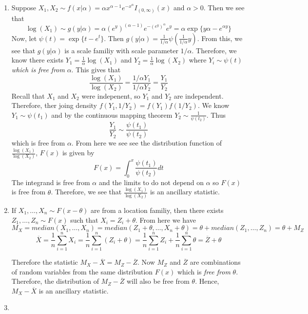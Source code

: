 \documentclass[12pt]{article}  %
\begin{document}
\begin{enumerate}
\begin{enumerate}
\end{enumerate}

\item Suppose $X_1, X_2\sim f(x|\alpha) = \alpha x^{\alpha - 1}e^{-x^{\alpha}}I_{(0, \infty)}(x)$ and $\alpha >0$. Then we see that $$\log(X_1) \sim g(y|\alpha) = \alpha(e^{y})^{(\alpha - 1)}e^{-(e^{y})^{\alpha}}e^{y} = \alpha \exp\big\{y\alpha - e^{\alpha y}\big\}$$ Now, let $\psi(t) = \exp\{t - e^t\}$. Then $g(y|\alpha) = \frac{1}{1/\alpha}\psi(\frac{1}{1/\alpha}y)$. From this, we see that $g(y|\alpha)$ is a scale familiy with scale parameter $1/\alpha$. Therefore, we know there exists $Y_1 = \frac{1}{\alpha}\log(X_1)$ and  $Y_2 = \frac{1}{\alpha}\log(X_2)$ where $Y_i\sim\psi(t)$ \textit{which is free from} $\alpha$. This gives that $$\frac{\log(X_1)}{\log(X_2)} = \frac{1/\alpha Y_1}{1/\alpha Y_2} = \frac{Y_1}{Y_2}$$ Recall that $X_1$ and $X_2$ were indepenent, so $Y_1$ and $Y_2$ are independent. Therefore, ther joing density $f(Y_1, 1/Y_2) = f(Y_1)f(1/Y_2)$. We know $Y_1\sim \psi(t_1)$ and by the continuous mapping theorem $Y_2 \sim \frac{1}{\psi(t_2)}$. Thus $$\frac{Y_1}{Y_2}\sim \frac{\psi(t_1)}{\psi(t_2)}$$ which is free from $\alpha$. From here we see see the distribution function of $\frac{\log(X_1)}{\log(X_2)}$, $F(x)$ is given by $$F(x) = \int_{0}^{x}\frac{\psi(t_1)}{\psi(t_2)}dt$$ The integrand is free from $\alpha$ and the limits to do not depend on $\alpha$ so $F(x)$ is free from $\theta$. Therefore, we see that $\frac{\log(X_1)}{\log(X_2)}$ is an ancillary statistic. 

\item If $X_1,\ldots, X_n\sim F(x-\theta)$ are from a location familiy, then there exists $Z_1,\ldots, Z_n\sim F(x)$ such that $X_i = Z_i + \theta$. From here we have  $$M_X = median(X_1, \ldots, X_n)= median(Z_1+\theta, \ldots, X_n+\theta) = \theta + median(Z_1, \ldots, Z_n) = \theta + M_Z$$
$$\overline{X} = \frac{1}{n}\sum_{i=1}^{n}X_i = \frac{1}{n}\sum_{i=1}^{n}(Z_i + \theta)   =\frac{1}{n}\sum_{i=1}^{n}Z_i + \frac{1}{n}\sum_{i=1}^{n}\theta = \overline{Z} + \theta$$

Therefore the statistic $M_X - \overline{X} = M_Z - \overline{Z}$. Now $M_Z$ and $\overline{Z}$ are combinations of random variables from the same distribution $F(x)$ which is \textit{free from} $\theta$. Therefore, the distribution of $M_Z - \overline{Z}$ will also be free from $\theta$. Hence, $M_X - \overline{X}$ is an ancillary statistic. 

\item 


\end{enumerate}
\end{document}
